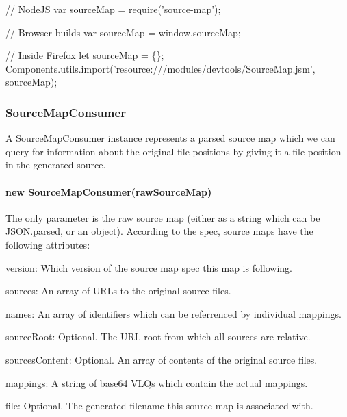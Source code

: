 \begin{DoxyCode}
\textcolor{comment}{// NodeJS}
var sourceMap = require(\textcolor{stringliteral}{'source-map'});

\textcolor{comment}{// Browser builds}
var sourceMap = window.sourceMap;

\textcolor{comment}{// Inside Firefox}
let sourceMap = \{\};
Components.utils.import(\textcolor{stringliteral}{'resource:///modules/devtools/SourceMap.jsm'}, sourceMap);
\end{DoxyCode}


\subsubsection*{Source\+Map\+Consumer}

A Source\+Map\+Consumer instance represents a parsed source map which we can query for information about the original file positions by giving it a file position in the generated source.

\paragraph*{new Source\+Map\+Consumer(raw\+Source\+Map)}

The only parameter is the raw source map (either as a string which can be {\ttfamily J\+S\+O\+N.\+parse}\textquotesingle{}d, or an object). According to the spec, source maps have the following attributes\+:


\begin{DoxyItemize}
\item {\ttfamily version}\+: Which version of the source map spec this map is following.
\item {\ttfamily sources}\+: An array of U\+R\+Ls to the original source files.
\item {\ttfamily names}\+: An array of identifiers which can be referrenced by individual mappings.
\item {\ttfamily source\+Root}\+: Optional. The U\+R\+L root from which all sources are relative.
\item {\ttfamily sources\+Content}\+: Optional. An array of contents of the original source files.
\item {\ttfamily mappings}\+: A string of base64 V\+L\+Qs which contain the actual mappings.
\item {\ttfamily file}\+: Optional. The generated filename this source map is associated with.
\end{DoxyItemize}

